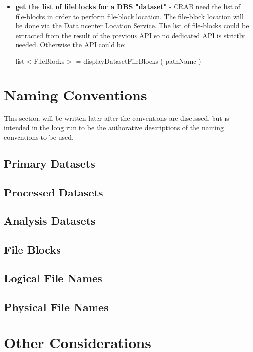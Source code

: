 \documentclass[pdftex]{cmspaper}
\begin{document}
{\begin{itemize}
\item {\bf get the list of fileblocks for a DBS "dataset"} - 
 CRAB need the list of file-blocks in order to perform file-block 
 location. The file-block location will be done via the Data n{center}
Location Service.
 The list of file-blocks could be extracted from the result 
 of the previous API so no dedicated API is strictly needed.
 Otherwise the API could be:
 \begin{center}
   list$<$FileBlocks$>$ = displayDatasetFileBlocks ( pathName )
 \end{center}


\end{itemize}


\section{Naming Conventions}

  This section will be written later after the conventions are discussed, but 
is intended in the long run to be the authorative descriptions of the naming
conventions to be used.
\subsection{Primary Datasets}
\subsection{Processed Datasets}
\subsection{Analysis Datasets}
\subsection{File Blocks}
\subsection{Logical File Names}
\subsection{Physical File Names}

\section{Other Considerations}

}
\end{document}
